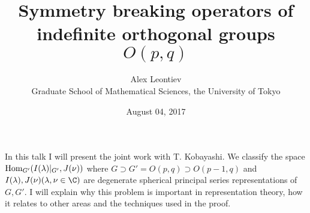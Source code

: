 \documentclass[8pt]{article} %
\title{Symmetry breaking operators of indefinite orthogonal groups $O(p,q)$}
\author{Alex Leontiev\\Graduate School of Mathematical Sciences, the University of Tokyo}
\date{August 04, 2017}
\newcommand{\Hom}{\mbox{\normalfont Hom}}
\theoremstyle{definition}
\begin{document}
\maketitle
In this talk I will present the joint work with T. Kobayashi.
We classify the space $\Hom_{G'}(I(\lambda)\kern-0.1cm\mid_{G'},J(\nu))$ where $G\supset G'=O(p,q)\supset O(p-1,q)$ and $I(\lambda),J(\nu)(\lambda,\nu\in\C)$ are
degenerate spherical principal series representations of $G,G'$.
I will explain why this problem is important in representation theory, how it relates to other areas
and the techniques used in the proof.
\end{document}
